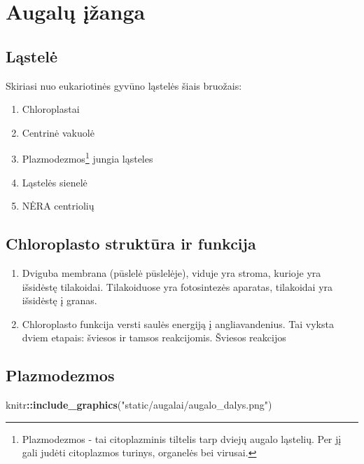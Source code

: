 \documentclass[]{book}
\newenvironment{Shaded}{\begin{snugshade}}{\end{snugshade}}
\newcommand{\KeywordTok}[1]{\textcolor[rgb]{0.13,0.29,0.53}{\textbf{#1}}}
\newcommand{\NormalTok}[1]{#1}
\newcommand{\OperatorTok}[1]{\textcolor[rgb]{0.81,0.36,0.00}{\textbf{#1}}}
\newcommand{\StringTok}[1]{\textcolor[rgb]{0.31,0.60,0.02}{#1}}
\providecommand{\tightlist}{%
  \setlength{\itemsep}{0pt}\setlength{\parskip}{0pt}}
\let\rmarkdownfootnote\footnote%
\def\footnote{\protect\rmarkdownfootnote}
\begin{document}
\hypertarget{augalu-izanga}{%
\chapter{Augalų įžanga}\label{augalu-izanga}}

\hypertarget{lastele}{%
\section{Ląstelė}\label{lastele}}

Skiriasi nuo eukariotinės gyvūno ląstelės šiais bruožais:

\begin{enumerate}
\def\labelenumi{\arabic{enumi}.}
\tightlist
\item
  Chloroplastai
\item
  Centrinė vakuolė
\item
  Plazmodezmos\footnote{Plazmodezmos - tai citoplazminis tiltelis tarp dviejų augalo ląstelių. Per jį gali judėti citoplazmos turinys, organelės bei virusai.} jungia ląsteles
\item
  Ląstelės sienelė
\item
  NĖRA centriolių
\end{enumerate}

\hypertarget{chloroplasto-struktura-ir-funkcija}{%
\section{Chloroplasto struktūra ir funkcija}\label{chloroplasto-struktura-ir-funkcija}}

\begin{enumerate}
\def\labelenumi{\arabic{enumi}.}
\tightlist
\item
  Dviguba membrana (pūslelė pūslelėje), viduje yra stroma, kurioje yra išsidėstę tilakoidai. Tilakoiduose yra fotosintezės aparatas, tilakoidai yra išsidėstę į granas.
\item
  Chloroplasto funkcija versti saulės energiją į angliavandenius. Tai vyksta dviem etapais: šviesos ir tamsos reakcijomis. Šviesos reakcijos
\end{enumerate}

\hypertarget{plazmodezmos}{%
\section{Plazmodezmos}\label{plazmodezmos}}

\begin{Shaded}
\begin{Highlighting}[]
\NormalTok{knitr}\OperatorTok{::}\KeywordTok{include_graphics}\NormalTok{(}\StringTok{"static/augalai/augalo_dalys.png"}\NormalTok{)}
\end{Highlighting}
\end{Shaded}
\end{document}
